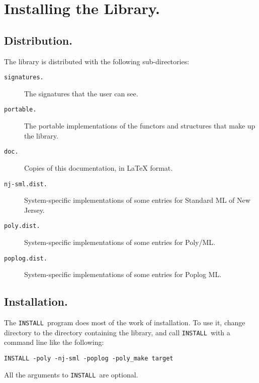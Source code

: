 %
%
%
%
%
%

\chapter{Installing the Library.}	\label{install}

\section{Distribution.}

The library is distributed with the following sub-directories:

\begin{description}
  \item[\tt signatures.] The signatures that the user can see.
  \item[\tt portable.] The portable implementations of the functors
	and structures that make up the library.
  \item[\tt doc.] Copies of this documentation, in LaTeX format.
  \item[\tt nj-sml.dist.] System-specific implementations of some entries
	for Standard ML of New Jersey.
  \item[\tt poly.dist.] System-specific implementations of some entries
	for Poly/ML.
  \item[\tt poplog.dist.] System-specific implementations of some entries
	for Poplog ML.
\end{description} 

\section{Installation.}

\newcommand{\install}{{\small\tt INSTALL}}

The \install\ program does most of the work of installation.
To use it, change directory to the directory containing the library,
and call \install\ with a command line like the following:
\begin{verbatim}
INSTALL -poly -nj-sml -poplog -poly_make target
\end{verbatim}
All the arguments to \install\ are optional.

